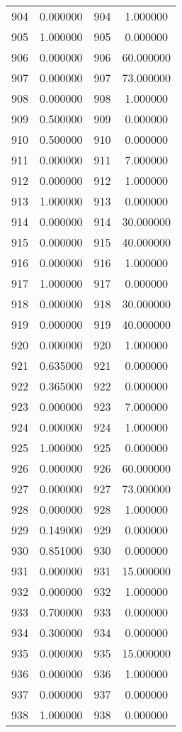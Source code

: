 \documentclass[12pt]{article}
\begin{document}
\begin{longtable}{@{}cccc@{}}
904 & 0.000000 & 904 & 1.000000 \\
905 & 1.000000 & 905 & 0.000000 \\
906 & 0.000000 & 906 & 60.000000 \\
907 & 0.000000 & 907 & 73.000000 \\
908 & 0.000000 & 908 & 1.000000 \\
909 & 0.500000 & 909 & 0.000000 \\
910 & 0.500000 & 910 & 0.000000 \\
911 & 0.000000 & 911 & 7.000000 \\
912 & 0.000000 & 912 & 1.000000 \\
913 & 1.000000 & 913 & 0.000000 \\
914 & 0.000000 & 914 & 30.000000 \\
915 & 0.000000 & 915 & 40.000000 \\
916 & 0.000000 & 916 & 1.000000 \\
917 & 1.000000 & 917 & 0.000000 \\
918 & 0.000000 & 918 & 30.000000 \\
919 & 0.000000 & 919 & 40.000000 \\
920 & 0.000000 & 920 & 1.000000 \\
921 & 0.635000 & 921 & 0.000000 \\
922 & 0.365000 & 922 & 0.000000 \\
923 & 0.000000 & 923 & 7.000000 \\
924 & 0.000000 & 924 & 1.000000 \\
925 & 1.000000 & 925 & 0.000000 \\
926 & 0.000000 & 926 & 60.000000 \\
927 & 0.000000 & 927 & 73.000000 \\
928 & 0.000000 & 928 & 1.000000 \\
929 & 0.149000 & 929 & 0.000000 \\
930 & 0.851000 & 930 & 0.000000 \\
931 & 0.000000 & 931 & 15.000000 \\
932 & 0.000000 & 932 & 1.000000 \\
933 & 0.700000 & 933 & 0.000000 \\
934 & 0.300000 & 934 & 0.000000 \\
935 & 0.000000 & 935 & 15.000000 \\
936 & 0.000000 & 936 & 1.000000 \\
937 & 0.000000 & 937 & 0.000000 \\
938 & 1.000000 & 938 & 0.000000 \\

\end{longtable}
\end{document}
